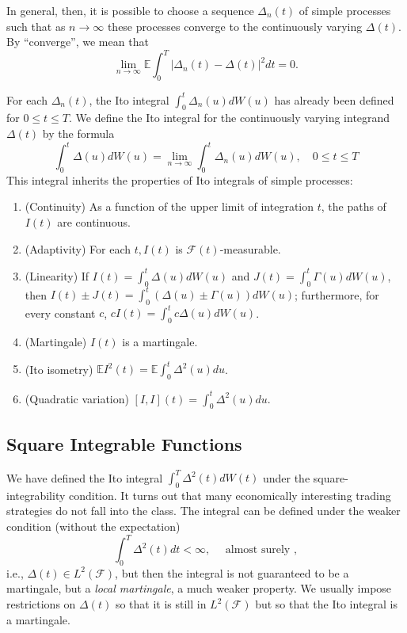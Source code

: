 \documentclass[\topdir/lecture\_notes.tex]{subfiles}
\begin{document}
In general, then, it is possible to choose a sequence $\Delta_{n}(t)$ of simple processes such that as $n \rightarrow \infty$ these processes converge to the continuously varying $\Delta(t)$. By ``converge'', we mean that
\begin{equation*}
\lim _{n \rightarrow \infty} \mathbb{E} \int_{0}^{T}\left|\Delta_{n}(t)-\Delta(t)\right|^{2} dt=0.
\end{equation*}

For each $\Delta_{n}(t)$, the Ito integral $\int_{0}^{t} \Delta_{n}(u) d W(u)$ has already been defined for $0 \leq t \leq T$. We define the Ito integral for the continuously varying integrand $\Delta(t)$ by the formula
\begin{equation*}
\int_{0}^{t} \Delta(u) d W(u)=\lim _{n \rightarrow \infty} \int_{0}^{t} \Delta_{n}(u) d W(u), \quad 0 \leq t \leq T
\end{equation*}
This integral inherits the properties of Ito integrals of simple processes:
\begin{enumerate}[label=(\roman*)]
    \item (Continuity) As a function of the upper limit of integration $t$, the paths of $I(t)$ are continuous.
    
    \item (Adaptivity) For each $t, I(t)$ is $\mathcal{F}(t)$-measurable.
    
    \item (Linearity) If $I(t)=\int_{0}^{t} \Delta(u) d W(u)$ and $J(t)=\int_{0}^{t} \Gamma(u) d W(u)$, then $I(t) \pm J(t)=\int_{0}^{t}(\Delta(u) \pm \Gamma(u)) d W(u)$; furthermore, for every constant $c$, $c I(t)=\int_{0}^{t} c \Delta(u) d W(u)$.
    
    \item (Martingale) $I(t)$ is a martingale.
    
    \item (Ito isometry) $\mathbb{E} I^{2}(t)=\mathbb{E} \int_{0}^{t} \Delta^{2}(u) d u$.
    
    \item (Quadratic variation) $[I, I](t)=\int_{0}^{t} \Delta^{2}(u) d u$.
    \end{enumerate}

\subsection{Square Integrable Functions}
We have defined the Ito integral $\int_{0}^{T} \Delta^{2}(t) dW(t)$ under the square-integrability condition. It turns out that many economically interesting trading strategies do not fall into the class. The integral can be defined under the weaker condition (without the expectation)
\begin{equation*}
\int_{0}^{T} \Delta^{2}(t)dt<\infty, \quad \text{ almost surely },
\end{equation*}
i.e., $\Delta (t) \in L^{2}(\mathcal{F})$,
but then the integral is not guaranteed to be a martingale, but a \textit{local martingale}, a much weaker property. We usually impose restrictions on  $\Delta (t)$ so that it is still in $L^{2}(\mathcal{F})$ but so that the Ito integral is a martingale.
\end{document}
